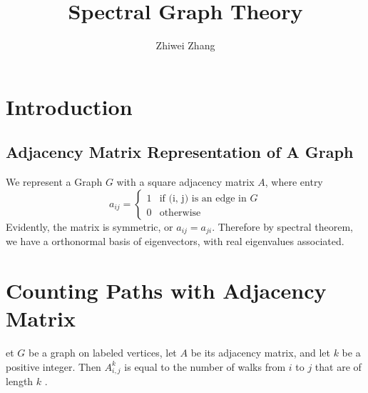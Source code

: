 \documentclass[12pt]{article}
\newenvironment{theorem}[2][Theorem]{\begin{trivlist}
\item[\hskip \labelsep {\bfseries #1}\hskip \labelsep {\bfseries #2.}]}{\end{trivlist}}
\begin{document}
 
 
 
\title{Spectral Graph Theory}
\author{Zhiwei Zhang}

 
\maketitle
\section{Introduction}
\subsection{Adjacency Matrix Representation of A Graph}
We represent a Graph $G$ with a square adjacency matrix $A$, where entry $$a_{ij} = \begin{cases}
1 &\text{if (i, j) is an edge in }G \\
0 &\text{otherwise}
\end{cases}$$
Evidently, the matrix is symmetric, or $a_{ij} = a_{ji}$. Therefore by spectral theorem, we have a orthonormal basis of eigenvectors, with real eigenvalues associated.

\section{Counting Paths with Adjacency Matrix}
\begin{theorem}
	Let $G$ be a graph on labeled vertices, let $A$ be its adjacency
	matrix, and let $k$ be a positive integer. Then $A_{i,j}^{k}$ is equal to the number of
	walks from $i$ to $j$ that are of length $k$ .
\end{theorem} 
\end{document}
